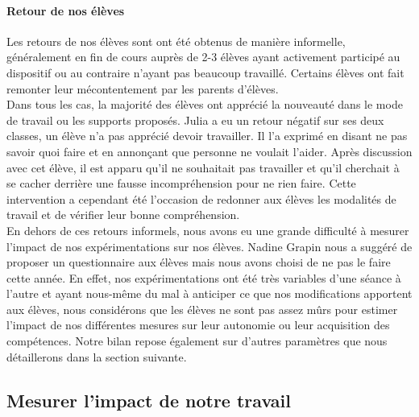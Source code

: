 \paragraph*{Retour de nos élèves}
Les retours de nos élèves sont ont été obtenus de manière informelle, généralement en fin de cours auprès de 2-3 élèves ayant activement participé au dispositif ou au contraire n'ayant pas beaucoup travaillé. Certains élèves ont fait remonter leur mécontentement par les parents d'élèves.\\
Dans tous les cas, la majorité des élèves ont apprécié la nouveauté dans le mode de travail ou les supports proposés. Julia a eu un retour négatif sur ses deux classes, un élève n'a pas apprécié devoir travailler. Il l'a exprimé en disant ne pas savoir quoi faire et en annonçant que personne ne voulait l'aider. Après discussion avec cet élève, il est apparu qu'il ne souhaitait pas travailler et qu'il cherchait à se cacher derrière une fausse incompréhension pour ne rien faire. Cette intervention a cependant été l'occasion de redonner aux élèves les modalités de travail et de vérifier leur bonne compréhension.\\
En dehors de ces retours informels, nous avons eu une grande difficulté à mesurer l'impact de nos expérimentations sur nos élèves. Nadine Grapin nous a suggéré de proposer un questionnaire aux élèves mais nous avons choisi de ne pas le faire cette année. En effet, nos expérimentations ont été très variables d'une séance à l'autre et ayant nous-même du mal à anticiper ce que nos modifications apportent aux élèves, nous considérons que les élèves ne sont pas assez mûrs pour estimer l'impact de nos différentes mesures sur leur autonomie ou leur acquisition des compétences. Notre bilan repose également sur d'autres paramètres que nous détaillerons dans la section suivante.
\subsection{Mesurer l’impact de notre travail}\label{mesure_impact}
